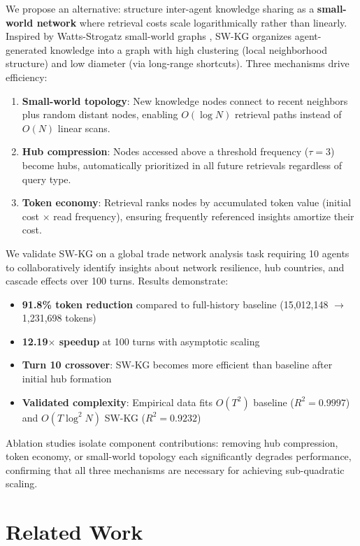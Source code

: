 \documentclass[11pt]{article}
\begin{document}
We propose an alternative: structure inter-agent knowledge sharing as a \textbf{small-world network} where retrieval costs scale logarithmically rather than linearly. Inspired by Watts-Strogatz small-world graphs \cite{watts1998}, SW-KG organizes agent-generated knowledge into a graph with high clustering (local neighborhood structure) and low diameter (via long-range shortcuts). Three mechanisms drive efficiency:

\begin{enumerate}
    \item \textbf{Small-world topology}: New knowledge nodes connect to recent neighbors plus random distant nodes, enabling $O(\log N)$ retrieval paths instead of $O(N)$ linear scans.
    \item \textbf{Hub compression}: Nodes accessed above a threshold frequency ($\tau = 3$) become hubs, automatically prioritized in all future retrievals regardless of query type.
    \item \textbf{Token economy}: Retrieval ranks nodes by accumulated token value (initial cost $\times$ read frequency), ensuring frequently referenced insights amortize their cost.
\end{enumerate}

We validate SW-KG on a global trade network analysis task requiring 10 agents to collaboratively identify insights about network resilience, hub countries, and cascade effects over 100 turns. Results demonstrate:

\begin{itemize}
    \item \textbf{91.8\% token reduction} compared to full-history baseline (15,012,148 $\rightarrow$ 1,231,698 tokens)
    \item \textbf{12.19$\times$ speedup} at 100 turns with asymptotic scaling
    \item \textbf{Turn 10 crossover}: SW-KG becomes more efficient than baseline after initial hub formation
    \item \textbf{Validated complexity}: Empirical data fits $O(T^2)$ baseline ($R^2 = 0.9997$) and $O(T \log^2 N)$ SW-KG ($R^2 = 0.9232$)
\end{itemize}

Ablation studies isolate component contributions: removing hub compression, token economy, or small-world topology each significantly degrades performance, confirming that all three mechanisms are necessary for achieving sub-quadratic scaling.

\section{Related Work}
\end{document}
